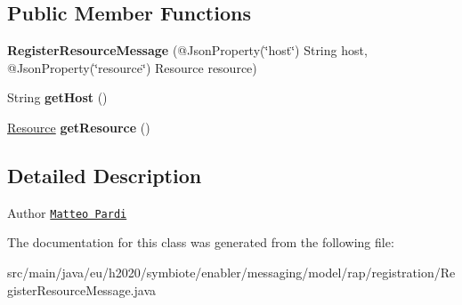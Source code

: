 \subsection*{Public Member Functions}
\begin{DoxyCompactItemize}
\item 
\mbox{\label{classeu_1_1h2020_1_1symbiote_1_1enabler_1_1messaging_1_1model_1_1rap_1_1registration_1_1RegisterResourceMessage_aa185802a25383a8772139eba2e47a5ff}} 
{\bfseries Register\+Resource\+Message} (@Json\+Property(\char`\"{}host\char`\"{}) String host, @Json\+Property(\char`\"{}resource\char`\"{}) Resource resource)
\item 
\mbox{\label{classeu_1_1h2020_1_1symbiote_1_1enabler_1_1messaging_1_1model_1_1rap_1_1registration_1_1RegisterResourceMessage_adb3dce87060ad990035dea16cc1e1ea2}} 
String {\bfseries get\+Host} ()
\item 
\mbox{\label{classeu_1_1h2020_1_1symbiote_1_1enabler_1_1messaging_1_1model_1_1rap_1_1registration_1_1RegisterResourceMessage_a75c715537d26ac3fc33d78d3d2f42974}} 
\hyperlink{classeu_1_1h2020_1_1symbiote_1_1model_1_1cim_1_1Resource}{Resource} {\bfseries get\+Resource} ()
\end{DoxyCompactItemize}


\subsection{Detailed Description}
\begin{DoxyAuthor}{Author}
\href{mailto:m.pardi@nextworks.it}{\tt Matteo Pardi} 
\end{DoxyAuthor}


The documentation for this class was generated from the following file\+:\begin{DoxyCompactItemize}
\item 
src/main/java/eu/h2020/symbiote/enabler/messaging/model/rap/registration/Register\+Resource\+Message.\+java\end{DoxyCompactItemize}

